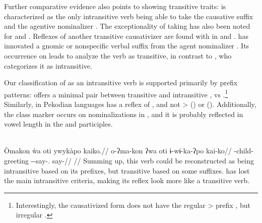 Further comparative evidence also points to   showing transitive traits:
\trio {} is characterized as the only intransitive verb being able to take the causative suffix  and the agentive nominalizer  \parencite[263, 169]{triomeira1999}.
The exceptionality of   taking   has also been noted for \kalina \parencite[82]{courtz2008carib} and \wayana \parencite[258]{wayanatavares2005}.
Reflexes of another transitive causativizer  \parencite{gildea2015valency} are found with  in \apalai \parencite[51]{koehn1986apalai} and \waiwai \parencite[52]{waiwaihawkins1998}.
\panare has innovated a gnomic or nonspecific verbal suffix  from the agent nominalizer  \parencite[184]{gildea1998}.
Its occurrence on  leads \parencite[214]{panarepayne2013} to analyze the verb as transitive, in contrast to \textcite[102]{mattei1994diccionario}, who categorizes it as intransitive.

Our classification of  as an intransitive verb is supported primarily by prefix patterns:
\kalina offers a minimal pair between transitive   and intransitive  ,   vs   \parencite[288, 45]{courtz2008carib}.\footnote{Interestingly, the \kalina causativized form   does not have the regular > prefix , but irregular  \parencite[430]{courtz2008carib}.}
Similarly,  in Pekodian languages has a reflex of   , and not >  (\bakairi) or  (\PXin).
Additionally, the  class marker  occurs on nominalizations in \kalina {}, and it is probably reflected in vowel length in the \trio \parencite[333]{triomeira1999} and \wayana \parencite[196]{wayanatavares2005} participles.

\kalina \parencite[][202]{courtz2008carib}\\
\begingl
\glpreamble Òmakon \`wa oti ywykàpo kaiko.//
\gla o-ʔma-kon ʔwa oti ɨ-wɨ-ka-ʔpo kai-ko//
\glb {}-child-  greeting --say-. say-//
\glft {}//
\endgl
\xe
%
Summing up, this verb could be reconstructed as being intransitive based on its prefixes, but transitive based on some suffixes.
\hixka has lost the main intransitive criteria, making its reflex look more like a transitive verb.

